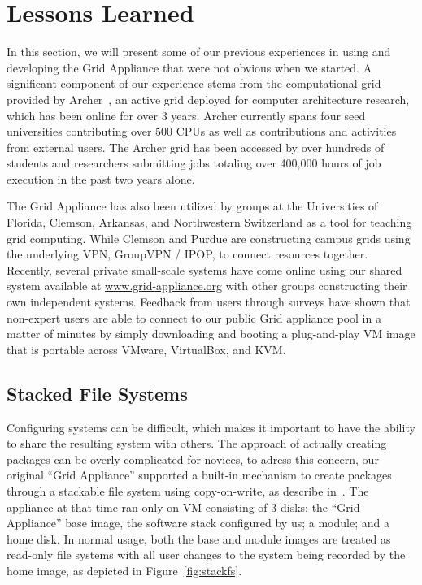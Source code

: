 \documentclass[conference]{IEEEtran}
\begin{document}
\section{Lessons Learned}
\label{lessons_learned}

In this section, we will present some of our previous experiences in using and
developing the Grid Appliance that were not obvious when we started.  A
significant component of our experience stems from the computational grid
provided by Archer~\cite{archer}, an active grid deployed for computer
architecture research, which has been online for over 3 years.  Archer
currently spans four seed universities contributing over 500 CPUs as well as
contributions and activities from external users.  The Archer grid has been
accessed by over hundreds of students and researchers submitting jobs totaling
over 400,000 hours of job execution in the past two years alone.

The Grid Appliance has also been utilized by groups at the Universities of
Florida, Clemson, Arkansas, and Northwestern Switzerland as a tool for teaching
grid computing.  While Clemson and Purdue are constructing campus grids using
the underlying VPN, GroupVPN / IPOP, to connect resources together.  Recently,
several private small-scale systems have come online using our shared system
available at \url{www.grid-appliance.org} with other groups constructing their
own independent systems.  Feedback from users through surveys have shown that
non-expert users are able to connect to our public Grid appliance pool in a
matter of minutes by simply downloading and booting a plug-and-play VM image
that is portable across VMware, VirtualBox, and KVM.

\subsection{Stacked File Systems}

Configuring systems can be difficult, which makes it important to have the
ability to share the resulting system with others.  The approach of actually
creating packages can be overly complicated for novices, to adress this
concern, our original ``Grid Appliance'' supported a built-in mechanism to
create packages through a stackable file system using copy-on-write, as
describe in~\cite{vtdc}.  The appliance at that time ran only on VM consisting
of 3 disks: the ``Grid Appliance'' base image, the software stack configured by
us; a module; and a home disk.  In normal usage, both the base and module
images are treated as read-only file systems with all user changes to the
system being recorded by the home image, as depicted in
Figure~\ref{fig:stackfs}.
\end{document}
